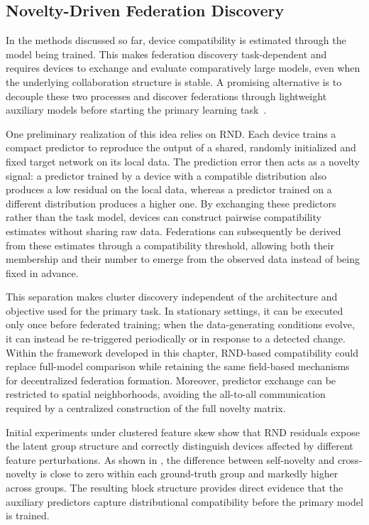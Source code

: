 \subsection{Novelty-Driven Federation Discovery}
\label{subsec:future-rnd-clustering}

In the methods discussed so far, 
 device compatibility is estimated through the model being trained.
%
This makes federation discovery task-dependent and requires devices to exchange
 and evaluate comparatively large models, even when the underlying collaboration
 structure is stable.
%
A promising alternative is to decouple these two processes 
 and discover federations through lightweight auxiliary models before starting 
 the primary learning task~\cite{DBLP:journals/corr/abs-2606-30499}.

One preliminary realization of this idea relies on \gls{RND}.
%
Each device trains a compact predictor to reproduce the output of a shared,
 randomly initialized and fixed target network on its local data.
%
The prediction error then acts as a novelty signal: a predictor trained 
 by a device with a compatible distribution also produces a low residual on the local data, 
 whereas a predictor trained on a different distribution produces a higher one.
%
By exchanging these predictors rather than the task model, 
 devices can construct pairwise compatibility estimates without sharing raw data.
%
Federations can subsequently be derived from these estimates 
 through a compatibility threshold, 
 allowing both their membership and their number to emerge 
 from the observed data instead of being fixed in advance.

This separation makes cluster discovery independent of the architecture 
 and objective used for the primary task.
%
In stationary settings, 
 it can be executed only once before federated training;
 when the data-generating conditions evolve, 
 it can instead be re-triggered periodically or in response to a detected change.
%
Within the framework developed in this chapter, 
 RND-based compatibility could replace full-model comparison while retaining 
 the same field-based mechanisms for decentralized federation formation.
%
Moreover, 
 predictor exchange can be restricted to spatial neighborhoods, 
 avoiding the all-to-all communication required by a centralized construction 
 of the full novelty matrix.

Initial experiments under clustered feature skew show that \gls{RND} residuals expose
 the latent group structure and correctly distinguish devices affected by
 different feature perturbations.
%
As shown in , 
 the difference between self-novelty and cross-novelty is close to zero within each ground-truth group 
 and markedly higher across groups.
%
The resulting block structure provides direct evidence that the auxiliary predictors 
 capture distributional compatibility before the primary model is trained.

